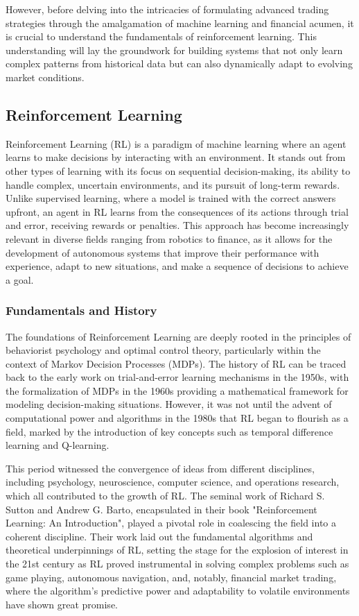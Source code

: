However, before delving into the intricacies of formulating advanced trading strategies through the amalgamation of machine learning and financial acumen, it is crucial to understand the fundamentals of reinforcement learning. This understanding will lay the groundwork for building systems that not only learn complex patterns from historical data but can also dynamically adapt to evolving market conditions.

\subsection{Reinforcement Learning}

Reinforcement Learning (RL) is a paradigm of machine learning where an agent learns to make decisions by interacting with an environment. It stands out from other types of learning with its focus on sequential decision-making, its ability to handle complex, uncertain environments, and its pursuit of long-term rewards. Unlike supervised learning, where a model is trained with the correct answers upfront, an agent in RL learns from the consequences of its actions through trial and error, receiving rewards or penalties. This approach has become increasingly relevant in diverse fields ranging from robotics to finance, as it allows for the development of autonomous systems that improve their performance with experience, adapt to new situations, and make a sequence of decisions to achieve a goal.

\subsubsection{Fundamentals and History}

The foundations of Reinforcement Learning are deeply rooted in the principles of behaviorist psychology and optimal control theory, particularly within the context of Markov Decision Processes (MDPs). The history of RL can be traced back to the early work on trial-and-error learning mechanisms in the 1950s, with the formalization of MDPs in the 1960s providing a mathematical framework for modeling decision-making situations. However, it was not until the advent of computational power and algorithms in the 1980s that RL began to flourish as a field, marked by the introduction of key concepts such as temporal difference learning and Q-learning.

This period witnessed the convergence of ideas from different disciplines, including psychology, neuroscience, computer science, and operations research, which all contributed to the growth of RL. The seminal work of Richard S. Sutton and Andrew G. Barto, encapsulated in their book "Reinforcement Learning: An Introduction", played a pivotal role in coalescing the field into a coherent discipline. Their work laid out the fundamental algorithms and theoretical underpinnings of RL, setting the stage for the explosion of interest in the 21st century as RL proved instrumental in solving complex problems such as game playing, autonomous navigation, and, notably, financial market trading, where the algorithm's predictive power and adaptability to volatile environments have shown great promise.

